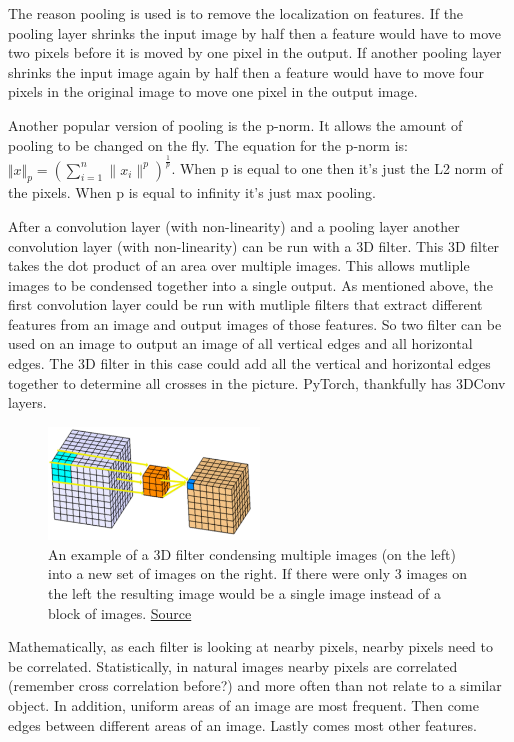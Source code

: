 The reason pooling is used is to remove the localization on features.
If the pooling layer shrinks the input image by half then a feature would have to move two pixels before it is moved by one pixel in the output.
If another pooling layer shrinks the input image again by half then a feature would have to move four pixels in the original image to move one pixel in the output image.

Another popular version of pooling is the p-norm.
It allows the amount of pooling to be changed on the fly.
The equation for the p-norm is: $\Vert x\Vert _p = (\sum_{i=1}^{n} \|x_i\|^p)^{\frac{1}{p}}$.
When p is equal to one then it's just the L2 norm of the pixels.
When p is equal to infinity it's just max pooling.

After a convolution layer (with non-linearity) and a pooling layer another convolution layer (with non-linearity) can be run with a 3D filter.
This 3D filter takes the dot product of an area over multiple images.
This allows mutliple images to be condensed together into a single output.
As mentioned above, the first convolution layer could be run with mutliple filters that extract different features from an image and output images of those features.
So two filter can be used on an image to output an image of all vertical edges and all horizontal edges.
The 3D filter in this case could add all the vertical and horizontal edges together to determine all crosses in the picture.
PyTorch, thankfully has 3DConv layers.

\begin{figure}[ht]
  \centering
      \includegraphics[width=0.5\textwidth]{lectures/03-b/images/3DConv.png}
          \caption{
            An example of a 3D filter condensing multiple images (on the left) into a new set of images on the right.
            If there were only 3 images on the left the resulting image would be a single image instead of a block of images.
            \href{https://www.kaggle.com/shivamb/3d-convolutions-understanding-use-case}{Source}
          }
\end{figure}

Mathematically, as each filter is looking at nearby pixels, nearby pixels need to be correlated.
Statistically, in natural images nearby pixels are correlated (remember cross correlation before?) and more often than not relate to a similar object.
In addition, uniform areas of an image are most frequent.
Then come edges between different areas of an image.
Lastly comes most other features.

